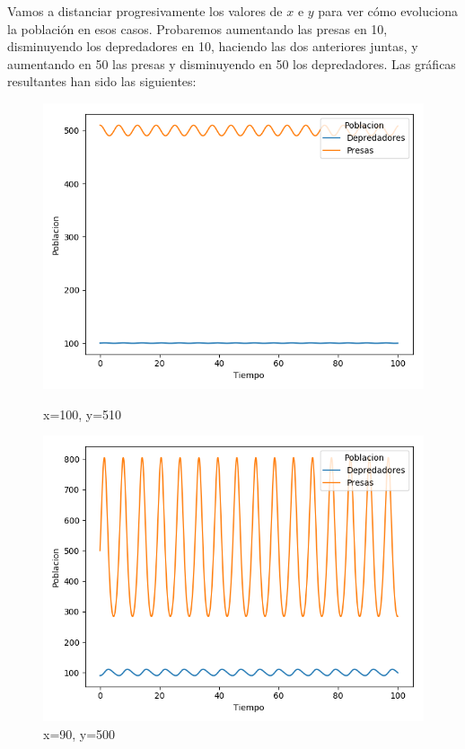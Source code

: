 \documentclass[11pt,a4paper]{article}
\begin{document}
Vamos a distanciar progresivamente los valores de $x$ e $y$ para ver cómo evoluciona la población en esos casos. Probaremos aumentando las
presas en 10, disminuyendo los depredadores en 10, haciendo las dos anteriores juntas, y aumentando en 50 las presas y disminuyendo en 50
los depredadores. Las gráficas resultantes han sido las siguientes:
\begin{figure}[H]
	\centering
	\begin{minipage}{0.5\textwidth}
	  \centering
	  \includegraphics[scale=0.4]{img/2-100-510.png}
	  \caption{x=100,  y=510}
	\end{minipage}%
	\begin{minipage}{0.5\textwidth}
	  \centering
	  \includegraphics[scale=0.4]{img/2-90-500.png}
	  \caption{x=90,  y=500}
	\end{minipage}
\end{figure}
\end{document}
